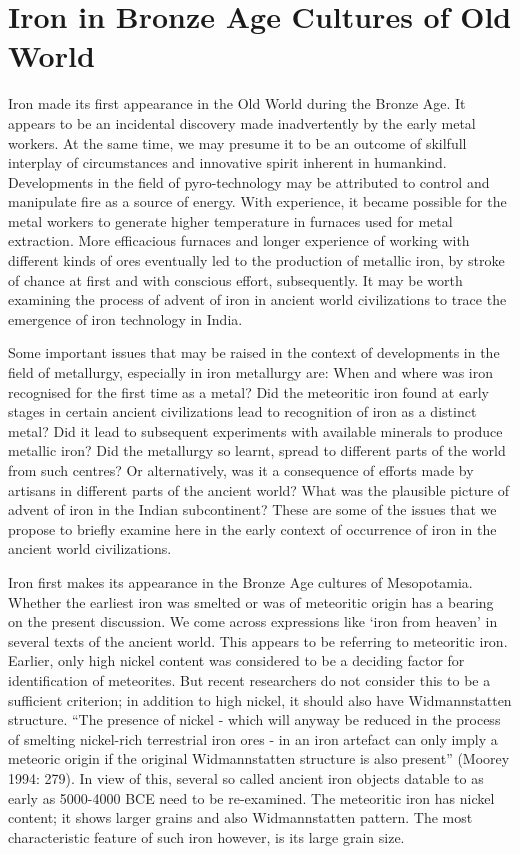 \chapter{Iron in Bronze Age Cultures of Old World}\label{chapter2}



Iron made its first appearance in the Old World during the Bronze Age. It appears to be an incidental discovery made inadvertently by the early metal workers. At the same time, we may presume it to be an outcome of skilfull interplay of circumstances and innovative spirit inherent in humankind. Developments in the field of pyro-technology may be attributed to control and manipulate fire as a source of energy. With experience, it became possible for the metal workers to generate higher temperature in furnaces used for metal extraction. More efficacious furnaces and longer experience of working with different kinds of ores eventually led to the production of metallic iron, by stroke of chance at first and with conscious effort, subsequently. It may be worth examining the process of advent of iron in ancient world civilizations to trace the emergence of iron technology in India. 

Some important issues that may be raised in the context of developments in the field of metallurgy, especially in iron metallurgy are: When and where was iron recognised for the first time as a metal? Did the meteoritic iron found at early stages in certain ancient civilizations lead to recognition of iron as a distinct metal? Did it lead to subsequent experiments with available minerals to produce metallic iron? Did the metallurgy so learnt, spread to different parts of the world from such centres? Or alternatively, was it a consequence of efforts made by artisans in different parts of the ancient world? What was the plausible picture of advent of iron in the Indian subcontinent? These are some of the issues that we propose to briefly examine here in the early context of occurrence of iron in the ancient world civilizations.

Iron first makes its appearance in the Bronze Age cultures of Mesopotamia. Whether the earliest iron was smelted or was of meteoritic origin has a bearing on the present discussion. We come across expressions like ‘iron from heaven’ in several texts of the ancient world. This appears to be referring to meteoritic iron. Earlier, only high nickel content was considered to be a deciding factor for identification of meteorites. But recent researchers do not consider this to be a sufficient criterion; in addition to high nickel, it should also have Widmannstatten structure. “The presence of nickel - which will anyway be reduced in the process of smelting nickel-rich terrestrial iron ores - in an iron artefact can only imply a meteoric origin if the original Widmannstatten structure is also present” (Moorey 1994: 279). In view of this, several so called ancient iron objects datable to as early as 5000-4000 BCE need to be re-examined. The meteoritic iron has nickel content; it shows larger grains and also Widmannstatten pattern. The most characteristic feature of such iron however, is its large grain size.

